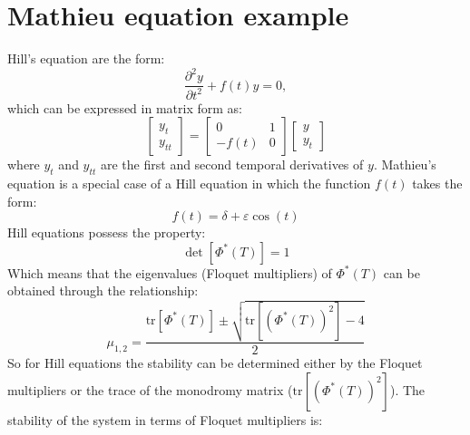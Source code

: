 \documentclass{article}
\begin{document}
\newpage
\section*{Mathieu equation example}
Hill's equation are the form:
\begin{equation*}
 \frac{\partial^2y}{\partial{t^2}}+f(t)y=0, 
\end{equation*}
which can be expressed in matrix form as:
 \begin{equation*}
  \begin{bmatrix*}
  y_t \\
  y_{tt}
 \end{bmatrix*}
 =\begin{bmatrix*}
  0 & 1 \\
  -f(t) & 0
 \end{bmatrix*}
 \begin{bmatrix*}
  y \\
  y_t 
 \end{bmatrix*}
 \end{equation*}
 where $y_t$ and $y_{tt}$ are the first and second temporal derivatives of $y$.
Mathieu's equation is a special case of a Hill equation in which the function $f(t)$ takes the form: 
\begin{equation*}
 f(t)=\delta+\varepsilon\cos(t)
\end{equation*}
Hill equations possess the property:
\begin{equation*}
 \det[\Phi^*(T)]=1
\end{equation*}
Which means that the eigenvalues (Floquet multipliers) of $\Phi^*(T)$ 
can be obtained through the relationship:
\begin{equation}
 \mu_{1,2}=\frac{\text{tr}[\Phi^*(T)]\pm\sqrt{\text{tr}[(\Phi^*(T))^2]-4}}{2}
 \label{eq:eigroots}
\end{equation}
So for Hill equations the stability can be determined either by the Floquet multipliers 
or the trace of the monodromy matrix ($\text{tr}[(\Phi^*(T))^2]$).
The stability of the system in terms of Floquet multipliers is:
\end{document}

